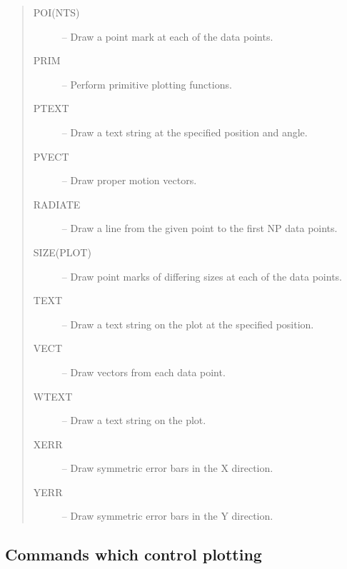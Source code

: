 \documentclass[twoside,11pt]{article}
\newcommand{\htmlref}[2]{#1}
\renewcommand{\_}{\texttt{\symbol{95}}}
\newcommand{\iref} [1]{\htmlref{#1}{#1}}
\newcommand{\iiref}[2]{\htmlref{#1}{#2}}
\begin{document}
\begin {quote}
\begin {description}
  \item [\iiref{POI(NTS)}{POINTS}] -- Draw a point mark at each of the
    data points.
  \item [\iref{PRIM}] -- Perform primitive plotting functions.
  \item [\iref{PTEXT}] -- Draw a text string at the specified position and
    angle.
  \item [\iref{PVECT}] -- Draw proper motion vectors.
  \item [\iref{RADIATE}] -- Draw a line from the given point to the first NP
    data points.
  \item [\iiref{SIZE(PLOT)}{SIZEPLOT}] -- Draw point marks of differing
    sizes at each of the data points.
  \item [\iref{TEXT}] -- Draw a text string on the plot at the
    specified position.
  \item [\iref{VECT}] -- Draw vectors from each data point.
  \item [\iref{WTEXT}] -- Draw a text string on the plot.
  \item [\iref{XERR}] -- Draw symmetric error bars in the X direction.
  \item [\iref{YERR}] -- Draw symmetric error bars in the Y direction.
  \end {description}
\end {quote}
\normalsize


\subsection{Commands which control plotting}
\end{document}
